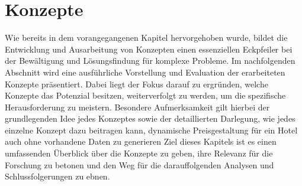 \chapter{Konzepte}
\label{chap:konzepte}
Wie bereits in dem vorangegangenen Kapitel \emph{} hervorgehoben wurde, bildet die Entwicklung und Ausarbeitung von Konzepten einen essenziellen Eckpfeiler bei der Bewältigung und Lösungsfindung für komplexe Probleme. Im nachfolgenden Abschnitt wird eine ausführliche Vorstellung und Evaluation der erarbeiteten Konzepte präsentiert. Dabei liegt der Fokus darauf zu ergründen, welche Konzepte das Potenzial besitzen, weiterverfolgt zu werden, um die spezifische Herausforderung zu meistern. Besondere Aufmerksamkeit gilt hierbei der grundlegenden Idee jedes Konzeptes sowie der detaillierten Darlegung, wie jedes einzelne Konzept dazu beitragen kann, dynamische Preisgestaltung für ein Hotel auch ohne vorhandene Daten zu generieren
\newline
\newline
Ziel dieses Kapitels ist es einen umfassenden Überblick über die Konzepte zu geben, ihre Relevanz für die Forschung zu betonen und den Weg für die darauffolgenden Analysen und Schlussfolgerungen zu ebnen.





